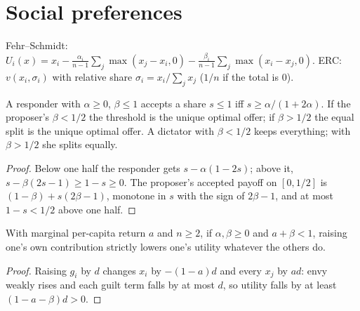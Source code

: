 \section{Social preferences}
\label{sec:beh-social}

\begin{definition}
\label{def:beh-fs}
\leanok
Fehr--Schmidt: $U_i(x)=x_i-\frac{\alpha_i}{n-1}\sum_j\max(x_j-x_i,0)-\frac{\beta_i}{n-1}\sum_j\max(x_i-x_j,0)$.
ERC: $v(x_i,\sigma_i)$ with relative share $\sigma_i=x_i/\sum_jx_j$ ($1/n$ if the total is $0$).
\end{definition}

\begin{theorem}
\label{thm:beh-fs-ultimatum}
\leanok
{}
A responder with $\alpha\ge0$, $\beta\le1$ accepts a share $s\le1$ iff $s\ge\alpha/(1+2\alpha)$. If the proposer's
$\beta<1/2$ the threshold is the unique optimal offer; if $\beta>1/2$ the equal split is the unique optimal offer. A dictator with
$\beta<1/2$ keeps everything; with $\beta>1/2$ she splits equally.
\end{theorem}
\begin{proof}
\leanok
Below one half the responder gets $s-\alpha(1-2s)$; above it, $s-\beta(2s-1)\ge1-s\ge0$. The proposer's accepted
payoff on $[0,1/2]$ is $(1-\beta)+s(2\beta-1)$, monotone in $s$ with the sign of $2\beta-1$, and at most $1-s<1/2$
above one half.
\end{proof}

\begin{theorem}
\label{thm:beh-fs-pg}
\leanok
{}
With marginal per-capita return $a$ and $n\ge2$, if $\alpha,\beta\ge0$ and $a+\beta<1$, raising one's own
contribution strictly lowers one's utility whatever the others do.
\end{theorem}
\begin{proof}
\leanok
Raising $g_i$ by $d$ changes $x_i$ by $-(1-a)d$ and every $x_j$ by $ad$: envy weakly rises and each guilt term falls by
at most $d$, so utility falls by at least $(1-a-\beta)d>0$.
\end{proof}


